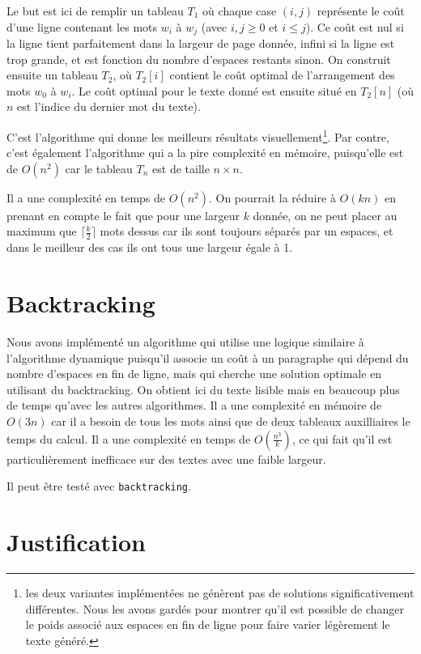 \documentclass[a4paper, 11pt]{article}
\begin{document}
Le but est ici de remplir un tableau $T_1$ où chaque case $(i, j)$ représente le
coût d'une ligne contenant les mots $w_i$ à $w_j$ (avec $i,j\ge 0$ et $i\le j$).
Ce coût est nul si la ligne tient parfaitement dans la largeur de page donnée,
infini si la ligne est trop grande, et est fonction du nombre d'espaces restants
sinon. On construit ensuite un tableau $T_2$, où $T_2[i]$ contient le coût
optimal de l'arrangement des mots $w_0$ à $w_i$. Le coût optimal pour le texte
donné est ensuite situé en $T_2[n]$ (où $n$ est l'indice du dernier mot du
texte).

C'est l'algorithme qui donne les meilleurs résultats visuellement\footnote{les
deux variantes implémentées ne génèrent pas de solutions significativement
différentes. Nous les avons gardés pour montrer qu'il est possible de changer le
poids associé aux espaces en fin de ligne pour faire varier légèrement le texte
généré.}. Par contre, c'est également l'algorithme qui a la pire complexité
en mémoire, puisqu'elle est de $O(n^2)$ car le tableau $T_n$ est de taille $n
\times n$.

Il a une complexité en temps de $O(n^2)$. On pourrait la réduire à $O(kn)$
en prenant en compte le fait que pour une largeur $k$ donnée, on ne peut
placer au maximum que $\lceil \frac{k}{2} \rceil$ mots dessus car ils sont
toujours séparés par un espaces, et dans le meilleur des cas ils ont tous une
largeur égale à 1.

\section{Backtracking}

Nous avons implémenté un algorithme qui utilise une logique similaire à
l'algorithme dynamique puisqu'il associe un coût à un paragraphe qui dépend du
nombre d'espaces en fin de ligne, mais qui cherche une solution optimale en
utilisant du backtracking. On obtient ici du texte lisible mais en beaucoup plus
de temps qu'avec les autres algorithmes. Il a une complexité en mémoire de
$O(3n)$ car il a besoin de tous les mots ainsi que de deux tableaux auxilliaires
le temps du calcul. Il a une complexité en temps de $O(\frac{n^3}{k})$, ce qui
fait qu'il est particulièrement inefficace sur des textes avec une faible
largeur.

Il peut être testé avec \verb|backtracking|.

\section{Justification}
\label{sec:justification}
\end{document}
